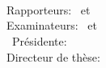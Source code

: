 \hfill
\vfill
{
	\small
	\textit{\thesisTitle} \\
    \thesisName\ \textcopyright\ \thesisDate \\
	\thesisSubject\\
	Rapporteurs: \thesisFirstReviewer\ et \thesisSecondReviewer \\
    Examinateurs: \thesisFirstExaminer\ et \thesisSecondExaminer\\\
    Présidente: \thesisPresident \\
	Directeur de th\`ese: \thesisFirstSupervisor\\
	\textbf{\thesisUniversity} \\
    \thesisUniversityDepartment \\[1.5em]
    \textbf{\thesisUniversityGroup} \\
	\thesisUniversityInstitute \\
    \thesisUniversityStreetAddress \\
	\thesisUniversityPostalCode\ \thesisUniversityCity~\thesisUniversityCityCedex
}
